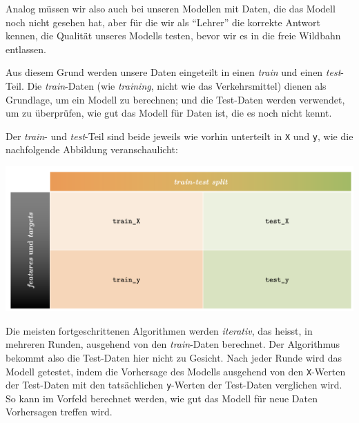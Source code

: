 \begin{lpu}
Analog müssen wir also auch bei unseren Modellen mit Daten, die das Modell noch nicht gesehen hat, aber für die wir als ``Lehrer'' die korrekte Antwort kennen, die Qualität unseres Modells testen, bevor wir es in die freie Wildbahn entlassen.

Aus diesem Grund werden unsere Daten eingeteilt in einen \textit{train} und einen \textit{test}-Teil. Die \textit{train}-Daten (wie \textit{training}, nicht wie das Verkehrsmittel) dienen als Grundlage, um ein Modell zu berechnen; und die Test-Daten werden verwendet, um zu überprüfen, wie gut das Modell für Daten ist, die es noch nicht kennt.

Der \textit{train}- und \textit{test}-Teil sind beide jeweils wie vorhin unterteilt in \texttt{X} und \texttt{y}, wie die nachfolgende Abbildung veranschaulicht:

\vspace{1em}
\begin{center}
  \includegraphics[width=0.9\linewidth]{testtrain.png}
\end{center}

Die meisten fortgeschrittenen Algorithmen werden \textit{iterativ}, das heisst, in mehreren Runden, ausgehend von den \textit{train}-Daten berechnet. Der Algorithmus bekommt also die Test-Daten hier nicht zu Gesicht. Nach jeder Runde wird das Modell getestet, indem die Vorhersage des Modells ausgehend von den \texttt{X}-Werten der Test-Daten mit den tatsächlichen \texttt{y}-Werten der Test-Daten verglichen wird. So kann im Vorfeld berechnet werden, wie gut das Modell für neue Daten Vorhersagen treffen wird.





\end{lpu}
